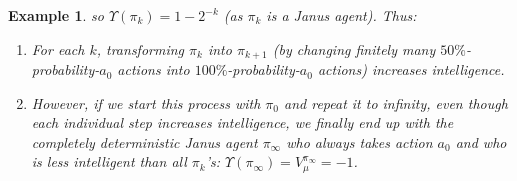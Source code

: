 \documentclass{article}
\newtheorem{example}[theorem]{Example}
\begin{document}
\begin{example}
    so $\Upsilon(\pi_k)=1-2^{-k}$ (as $\pi_k$ is a Janus agent).
    Thus:
    \begin{enumerate}
        \item For each $k$, transforming $\pi_k$ into $\pi_{k+1}$
            (by changing finitely many $50\%$-probability-$a_0$
            actions into $100\%$-probability-$a_0$ actions)
            \emph{increases} intelligence.
        \item However, if we start this process with $\pi_0$ and
            repeat it to infinity, even though each individual step
            \emph{increases} intelligence, we finally end up with
            the completely deterministic
            Janus agent $\pi_{\infty}$ who always takes action $a_0$ and who is
            \emph{less} intelligent than all $\pi_k$'s:
            $\Upsilon(\pi_{\infty})=V^{\pi_\infty}_\mu=-1$.
    \end{enumerate}
\end{example}



\end{document}
